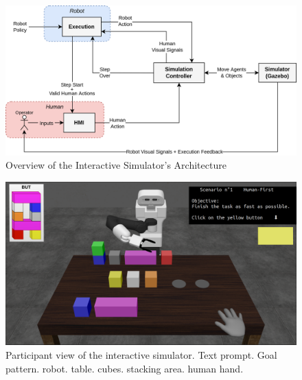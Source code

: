 \begin{figure}
    \includegraphics[width=\textwidth]{images/Chapter5/simu_architecture.png}
    \caption{Overview of the Interactive Simulator's Architecture}
    \label{fig:simu_architecture}
\end{figure}

\begin{figure}
    \centering
    \includegraphics[width=\textwidth]{images/Chapter5/simu_screenshot.png}
    \caption{Participant view of the interactive simulator. Text prompt. Goal pattern. robot. table. cubes. stacking area. human hand.}
    \label{fig:simu_view}
\end{figure}

